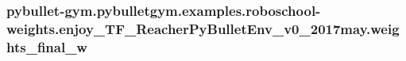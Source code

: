 \subsubsection[{\texorpdfstring{weights\+\_\+final\+\_\+w}{weights_final_w}}]{\setlength{\rightskip}{0pt plus 5cm}pybullet-\/gym.\+pybulletgym.\+examples.\+roboschool-\/weights.\+enjoy\+\_\+\+T\+F\+\_\+\+Reacher\+Py\+Bullet\+Env\+\_\+v0\+\_\+2017may.\+weights\+\_\+final\+\_\+w}\hypertarget{namespacepybullet-gym_1_1pybulletgym_1_1examples_1_1roboschool-weights_1_1enjoy___t_f___reacher_py_bullet_env__v0__2017may_a7cf65b7d191ab66d38ba5319df565b4e}{}\label{namespacepybullet-gym_1_1pybulletgym_1_1examples_1_1roboschool-weights_1_1enjoy___t_f___reacher_py_bullet_env__v0__2017may_a7cf65b7d191ab66d38ba5319df565b4e}

